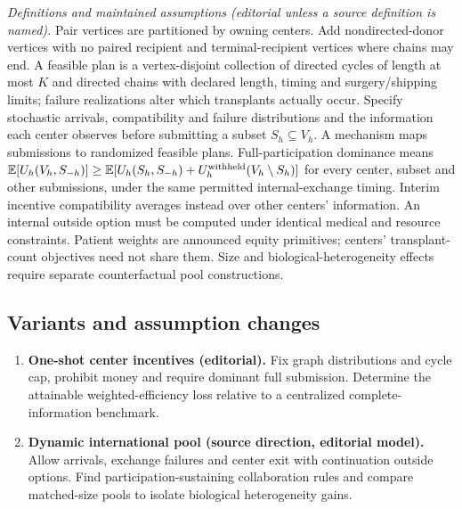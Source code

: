 \documentclass[11pt,a4paper]{article}
\begin{document}
\emph{Definitions and maintained assumptions (editorial unless a source definition is named).} Pair vertices are partitioned by owning centers. Add nondirected-donor vertices with no paired recipient and terminal-recipient vertices where chains may end. A feasible plan is a vertex-disjoint collection of directed cycles of length at most \(K\) and directed chains with declared length, timing and surgery/shipping limits; failure realizations alter which transplants actually occur. Specify stochastic arrivals, compatibility and failure distributions and the information each center observes before submitting a subset \(S_h\subseteq V_h\). A mechanism maps submissions to randomized feasible plans. Full-participation dominance means \(\mathbb E[U_h(V_h,S_{-h})]\ge\mathbb E[U_h(S_h,S_{-h})+U_h^{\rm withheld}(V_h\setminus S_h)]\) for every center, subset and other submissions, under the same permitted internal-exchange timing. Interim incentive compatibility averages instead over other centers’ information. An internal outside option must be computed under identical medical and resource constraints. Patient weights are announced equity primitives; centers’ transplant-count objectives need not share them. Size and biological-heterogeneity effects require separate counterfactual pool constructions.
\subsection*{Variants and assumption changes}
\begin{enumerate}
\item \textbf{One-shot center incentives (editorial).} Fix graph distributions and cycle cap, prohibit money and require dominant full submission. Determine the attainable weighted-efficiency loss relative to a centralized complete-information benchmark.
\item \textbf{Dynamic international pool (source direction, editorial model).} Allow arrivals, exchange failures and center exit with continuation outside options. Find participation-sustaining collaboration rules and compare matched-size pools to isolate biological heterogeneity gains.
\end{enumerate}
\end{document}
